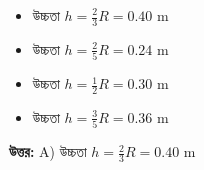 \documentclass[12pt, a4paper]{article}
\begin{document}
\begin{itemize}[label={}, leftmargin=1cm, itemsep=0.5em]
\item[\textbf{A)}] উচ্চতা $h = \frac{2}{3} R = 0.40\text{ m}$
\item[\textbf{B)}] উচ্চতা $h = \frac{2}{5} R = 0.24\text{ m}$
\item[\textbf{C)}] উচ্চতা $h = \frac{1}{2} R = 0.30\text{ m}$
\item[\textbf{D)}] উচ্চতা $h = \frac{3}{5} R = 0.36\text{ m}$
\end{itemize}

\vspace{0.5em}
\begin{tcolorbox}[answerbox]
\textbf{\color{success} উত্তর:} A) উচ্চতা $h = \frac{2}{3} R = 0.40\text{ m}$
\end{tcolorbox}
\vspace{1em}
\end{document}
